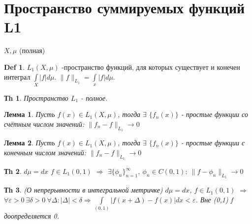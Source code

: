 \documentclass[14pt]{article}
\theoremstyle{plain}
\newtheorem{Thm}{Тh}
\newtheorem{Lem}{Лемма}
\theoremstyle{definition}
\newtheorem{Def}{Def}
\begin{document}
	\section{Пространство суммируемых функций L1}
		$X, \mu$ (полная)
		\begin{Def}
			$L_1(X, \mu)$ -пространство функций, для которых существует и конечен интеграл $\int\limits_X |f| d\mu$. $\|f\|_{L_1} = \int\limits_x |f|d\mu$. 
		\end{Def}
		\begin{Thm}
			Пространство $L_1$ - полное. 		
		\end{Thm}
		\begin{Lem}
			Пусть $f(x) \in L_1(X, \mu)$, тогда $\exists$ $\{f_n(x)\}$ - простые функции со счётным числом значений: $\| f_n - f \|_{L_1} \to 0$
		\end{Lem}
		\begin{Lem}
			Пусть $f(x) \in L_1(X, \mu)$, тогда $\exists$ $\{f_n(x)\}$ - простые функции с конечным числом значений: $\| f_n - f \|_{L_1} \to 0$
		\end{Lem}
		\begin{Thm}
			$d\mu = dx$ $f\in L_1(0,1)$ $\Rightarrow$ $\exists \{\phi_n\}_{n=1}^{\infty}, \ \phi_n \in C(0,1): \ \|f - \phi_n\|_{L_1} \to 0$
		\end{Thm}
		\begin{Thm}
			(О непрерывности в интегральной метричке)\newline
			$d\mu = dx$, $f \in L_1(0,1)$ $\Rightarrow$ $\forall \varepsilon >  0 \ \exists \delta > 0 \ \forall \Delta: |\Delta| < \delta \Rightarrow \int\limits_{(0,1)} |f(x+\Delta) - f(x)| dx < \varepsilon$. Вне (0,1) f доопределяется 0. 
		\end{Thm} 
\end{document}
